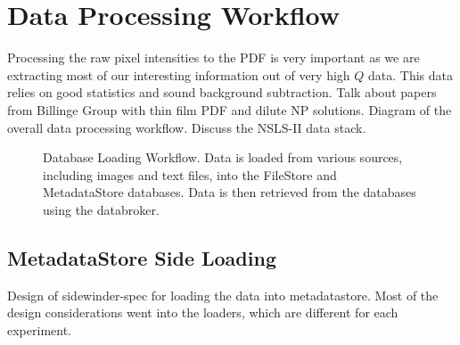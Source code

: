 \section{Data Processing Workflow}
Processing the raw pixel intensities to the PDF is very important as we are extracting most of our interesting information out of very high $Q$ data.
This data relies on good statistics and sound background subtraction.
Talk about papers from Billinge Group with thin film PDF and dilute NP solutions.
Diagram of the overall data processing workflow.
Discuss the NSLS-II data stack.
\begin{figure}
\centering
{}
\caption{Database Loading Workflow. Data is loaded from various sources, including images and text files, into the FileStore and MetadataStore databases. Data is then retrieved from the databases using the databroker.}
\end{figure}
\subsection{MetadataStore Side Loading}
Design of sidewinder-spec for loading the data into metadatastore.
Most of the design considerations went into the loaders, which are different for each experiment.
